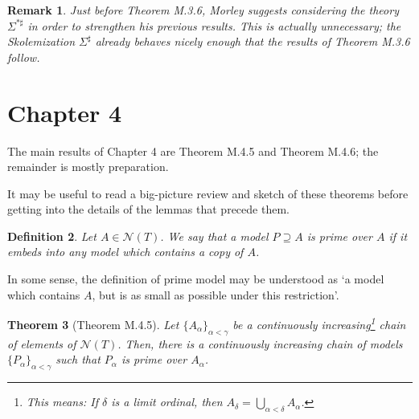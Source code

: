 \documentclass{article}
\newtheorem{theorem}{Theorem}[section]
\newtheorem{remark}[theorem]{Remark}
\newtheorem{definition}[theorem]{Definition}
\theoremstyle{nonumberplain}
\newcommand{\calN}{\mathcal{N}}
\begin{document}
\begin{remark}\label{rmk:starredundant}
Just before Theorem M.3.6, Morley suggests considering the theory $\Sigma^{* \sharp}$ in order to strengthen his previous results. This is actually unnecessary; the Skolemization $\Sigma^\sharp$ already behaves nicely enough that the results of Theorem M.3.6 follow.
\end{remark}

\section{Chapter 4}\label{sec:ch4}

The main results of Chapter 4 are Theorem M.4.5 and Theorem M.4.6; the remainder is mostly preparation.

It may be useful to read a big-picture review and sketch of these theorems before getting into the details of the lemmas that precede them.

\begin{definition}
Let $A \in \calN(T)$. We say that a model $P \supseteq A$ is \emph{prime over $A$} if it embeds into any model which contains a copy of $A$.
\end{definition}

In some sense, the definition of prime model may be understood as `a model which contains $A$, but is as small as possible under this restriction'. 

\begin{theorem}[Theorem M.4.5]
Let $\{A_\alpha\}_{\alpha<\gamma}$ be a continuously increasing\footnote{This means: If $\delta$ is a limit ordinal, then $A_\delta = \bigcup_{\alpha<\delta} A_\alpha$.} chain of elements of $\calN(T)$. Then, there is a continuously increasing chain of models $\{P_\alpha\}_{\alpha<\gamma}$ such that $P_\alpha$ is prime over $A_\alpha$.
\end{theorem}
\end{document}
